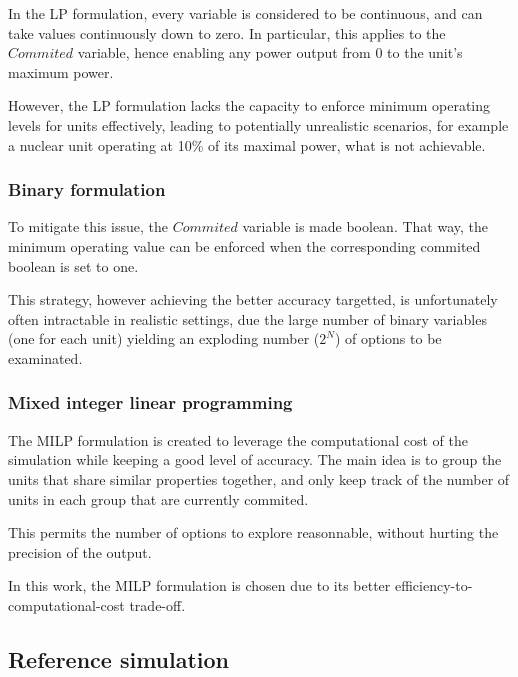 In the LP formulation, every variable is considered to be continuous, and can take values continuously down to zero. In particular, this applies to the $Commited$ variable, hence enabling any power output from 0 to the unit's maximum power.

However, the LP formulation lacks the capacity to enforce minimum operating levels for units effectively, leading to potentially unrealistic scenarios, for example a nuclear unit operating at 10\% of its maximal power, what is not achievable.

\subsubsection{Binary formulation}

To mitigate this issue, the $Commited$ variable is made boolean. That way, the minimum operating value can be enforced when the corresponding commited boolean is set to one.

This strategy, however achieving the better accuracy targetted, is unfortunately often intractable in realistic settings, due the large number of binary variables (one for each unit) yielding an exploding number ($2^N$) of options to be examinated.

\subsubsection{Mixed integer linear programming \label{subsubsection:milp}}

The MILP formulation is created to leverage the computational cost of the simulation while keeping a good level of accuracy. The main idea is to group the units that share similar properties together, and only keep track of the number of units in each group that are currently commited.

This permits the number of options to explore reasonnable, without hurting the precision of the output.

In this work, the MILP formulation is chosen due to its better efficiency-to-computational-cost trade-off.

\subsection{Reference simulation \label{section:reference-simulation}}